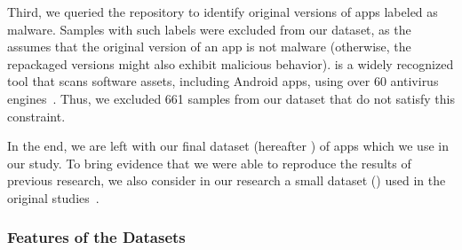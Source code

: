 Third, we queried the \vt repository
to identify original versions of apps labeled as malware. Samples with such labels were excluded from our dataset,
as the \mas assumes that the original version of an app is not malware (otherwise, the repackaged versions might
also exhibit malicious behavior). \vt is a widely recognized tool that scans software assets, including Android apps,
using over 60 antivirus engines~\cite{DBLP:journals/ese/KhanmohammadiEH19}. Thus, we excluded 661 samples from our dataset that
do not satisfy this constraint.

In the end, we are left with our final dataset (hereafter \cds) of \apps apps which we use in our study. 
To bring evidence that we were able to reproduce the results of previous research, we also consider in our research
a small dataset (\sds) used in the original studies~\cite{DBLP:conf/wcre/BaoLL18,DBLP:journals/jss/CostaMMSSBNR22}.







\subsubsection{Features of the Datasets}
 
